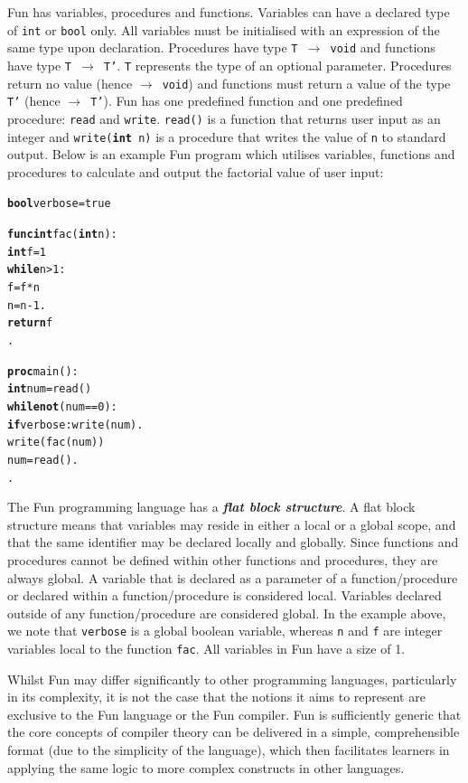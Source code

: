 \documentclass{l4proj}
\begin{document}
Fun has variables, procedures and functions. Variables can have a declared type of \texttt{int} or \texttt{bool} only. All variables must be initialised with an expression of the same type upon declaration. Procedures have type \texttt{T $\rightarrow$ void} and functions have type \texttt{T $\rightarrow$ T'}. \texttt{T} represents the type of an optional parameter. Procedures return no value (hence \texttt{$\rightarrow$ void}) and functions must return a value of the type \texttt{T'} (hence \texttt{$\rightarrow$ T'}). Fun has one predefined function and one predefined procedure: \texttt{read} and \texttt{write}. \texttt{read()} is a function that returns user input as an integer and \texttt{write(\textbf{int} n)} is a procedure that writes the value of \texttt{n} to standard output. Below is an example Fun program which utilises variables, functions and procedures to calculate and output the factorial value of user input:
\begin{alltt}
\textbf{bool} verbose = true

\textbf{func int} fac (\textbf{int} n):    
    \textbf{int} f = 1   
    \textbf{while} n > 1:    
        f = f*n   
        n = n-1  .   
    \textbf{return} f  
.  

\textbf{proc} main ():  
    \textbf{int} num = read()   
    \textbf{while not} (num == 0):    
        \textbf{if} verbose: write(num) .    
        write(fac(num))    
        num = read() .  
.
 \end{alltt}
 
The Fun programming language has a \textit{\textbf{flat block structure}}. A flat block structure means that variables may reside in either a local or a global scope, and that the same identifier may be declared locally and globally. Since functions and procedures cannot be defined within other functions and procedures, they are always global. A variable that is declared as a parameter of a function/procedure or declared within a function/procedure is considered local. Variables declared outside of any function/procedure are considered global. In the example above, we note that \texttt{verbose} is a global boolean variable, whereas \texttt{n} and \texttt{f} are integer variables local to the function \texttt{fac}. All variables in Fun have a size of 1.

Whilst Fun may differ significantly to other programming languages, particularly in its complexity, it is not the case that the notions it aims to represent are exclusive to the Fun language or the Fun compiler. Fun is sufficiently generic that the core concepts of compiler theory can be delivered in a simple, comprehensible format (due to the simplicity of the language), which then facilitates learners in applying the same logic to more complex constructs in other languages.
\end{document}

